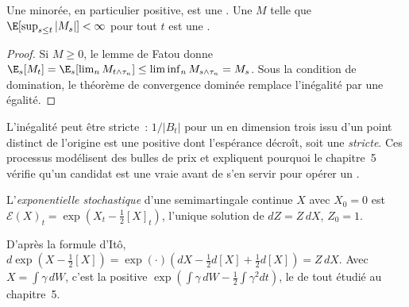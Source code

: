 \begin{proposition}\label{prop:qm:ito-calculus:super}
Une  minorée, en particulier positive, est une . Une
 $M$ telle que $\E[\sup_{s\le t}|M_s|] < \infty$ pour tout $t$ est une .
\end{proposition}

\begin{proof}
Si $M \ge 0$, le lemme de Fatou donne $\E_s[M_t] = \E_s[\lim_n M_{t\wedge\tau_n}] \le \liminf_n
M_{s\wedge\tau_n} = M_s$. Sous la condition de domination, le théorème de convergence dominée remplace l'inégalité par une
égalité.
\end{proof}

L'inégalité peut être stricte~: $1/|B_t|$ pour un  en dimension trois issu d'un point
distinct de l'origine est une  positive dont l'espérance décroît, soit une
 \emph{stricte}. Ces processus modélisent des bulles de prix et expliquent pourquoi le chapitre~5 vérifie
qu'un  candidat est une vraie  avant de s'en servir pour opérer un .

\begin{definition}\label{def:qm:ito-calculus:exp}
L'\emph{exponentielle stochastique} d'une semimartingale continue $X$
avec $X_0 = 0$ est $\mathcal E(X)_t = \exp(X_t - \tfrac12[X]_t)$, l'unique solution de $dZ = Z\,dX$,
$Z_0 = 1$.
\end{definition}

D'après la formule d'Itô, $d\exp(X - \tfrac12[X]) = \exp(\cdot)(dX - \tfrac12 d[X] + \tfrac12 d[X]) = Z\,dX$. Avec
$X = \int\gamma\,dW$, c'est la  positive $\exp(\int\gamma\,dW - \tfrac12\int\gamma^2dt)$,
le  de tout  étudié au chapitre~5.

